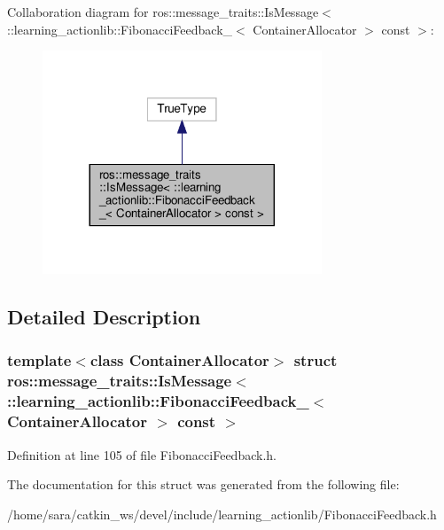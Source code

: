 Collaboration diagram for ros\+:\+:message\+\_\+traits\+:\+:Is\+Message$<$ \+:\+:learning\+\_\+actionlib\+:\+:Fibonacci\+Feedback\+\_\+$<$ Container\+Allocator $>$ const $>$\+:
\nopagebreak
\begin{figure}[H]
\begin{center}
\leavevmode
\includegraphics[width=236pt]{structros_1_1message__traits_1_1IsMessage_3_01_1_1learning__actionlib_1_1FibonacciFeedback___3_08a4f870418391bfdc8927a77946375a4}
\end{center}
\end{figure}


\subsection{Detailed Description}
\subsubsection*{template$<$class Container\+Allocator$>$\newline
struct ros\+::message\+\_\+traits\+::\+Is\+Message$<$ \+::learning\+\_\+actionlib\+::\+Fibonacci\+Feedback\+\_\+$<$ Container\+Allocator $>$ const $>$}



Definition at line 105 of file Fibonacci\+Feedback.\+h.



The documentation for this struct was generated from the following file\+:\begin{DoxyCompactItemize}
\item 
/home/sara/catkin\+\_\+ws/devel/include/learning\+\_\+actionlib/Fibonacci\+Feedback.\+h\end{DoxyCompactItemize}
